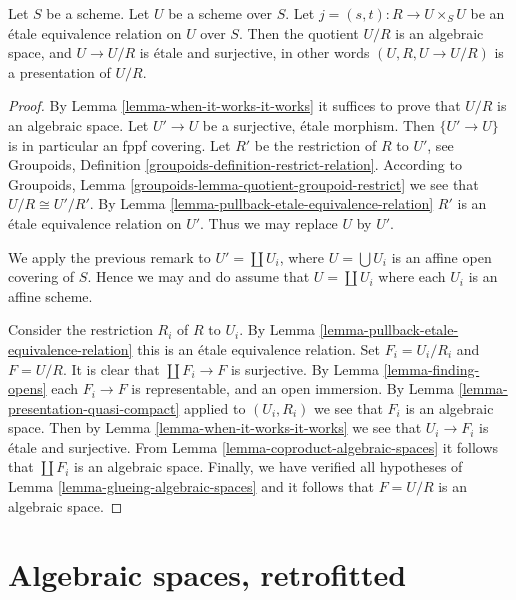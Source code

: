 \begin{theorem}
\label{theorem-presentation}
Let $S$ be a scheme. Let $U$ be a scheme over $S$.
Let $j = (s, t) : R \to U \times_S U$
be an \'etale equivalence relation on $U$ over $S$.
Then the quotient $U/R$ is an algebraic space,
and $U \to U/R$ is \'etale and surjective, in other words
$(U, R, U \to U/R)$ is a presentation of $U/R$.
\end{theorem}

\begin{proof}
By Lemma \ref{lemma-when-it-works-it-works}
it suffices to prove that $U/R$ is an algebraic space.
Let $U' \to U$ be a surjective, \'etale morphism.
Then $\{U' \to U\}$ is in particular an fppf covering.
Let $R'$ be the restriction of $R$ to $U'$, see
Groupoids, Definition \ref{groupoids-definition-restrict-relation}.
According to
Groupoids, Lemma \ref{groupoids-lemma-quotient-groupoid-restrict}
we see that $U/R \cong U'/R'$.
By Lemma \ref{lemma-pullback-etale-equivalence-relation} $R'$ is an
\'etale equivalence relation on $U'$. Thus we may replace $U$ by $U'$.

\medskip\noindent
We apply the previous remark to $U' = \coprod U_i$, where
$U = \bigcup U_i$ is an affine open covering of $S$. Hence we
may and do assume that $U = \coprod U_i$ where
each $U_i$ is an affine scheme.

\medskip\noindent
Consider the restriction $R_i$ of $R$ to $U_i$.
By Lemma \ref{lemma-pullback-etale-equivalence-relation}
this is an \'etale equivalence relation.
Set $F_i = U_i/R_i$ and $F = U/R$.
It is clear that $\coprod F_i \to F$ is surjective.
By Lemma \ref{lemma-finding-opens} each $F_i \to F$
is representable, and an open immersion.
By Lemma \ref{lemma-presentation-quasi-compact}
applied to $(U_i, R_i)$ we see that $F_i$ is an algebraic space.
Then by Lemma \ref{lemma-when-it-works-it-works} we see that
$U_i \to F_i$ is \'etale and surjective.
From Lemma \ref{lemma-coproduct-algebraic-spaces}
it follows that $\coprod F_i$ is an algebraic space.
Finally, we have verified all
hypotheses of Lemma \ref{lemma-glueing-algebraic-spaces}
and it follows that $F = U/R$ is an algebraic space.
\end{proof}










\section{Algebraic spaces, retrofitted}
\label{section-algebraic-spaces-retrofitted}

